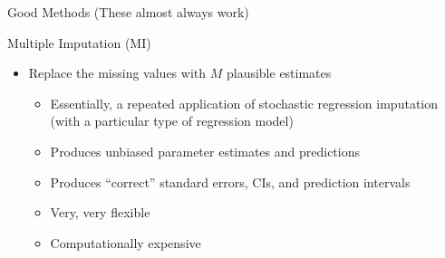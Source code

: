 \documentclass{beamer}\usepackage[]{graphicx}\usepackage[]{color}
\begin{document}
\begin{frame}{Good Methods (These almost always work)}

  Multiple Imputation (MI)
  \vc
  \begin{itemize}
  \item Replace the missing values with $M$ plausible estimates
    \vc
    \begin{itemize}
    \item Essentially, a repeated application of stochastic regression
      imputation (with a particular type of regression model)
      \vc
    \item Produces unbiased parameter estimates and predictions
      \vc
    \item Produces ``correct'' standard errors, CIs, and prediction intervals
      \vc
    \item Very, very flexible
      \vc
    \item Computationally expensive
    \end{itemize}
  \end{itemize}

\end{frame}

\watermarkoff %
\end{document}
